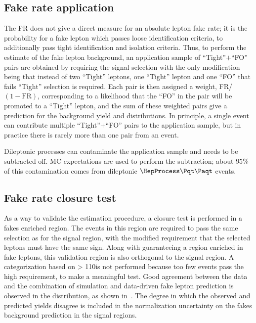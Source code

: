 \subsection{Fake rate application}
\label{subsec:fr_app}
The FR does not give a direct measure for an absolute lepton fake rate; it is the probability for a fake lepton which passes loose identification criteria, to additionally pass tight identification and isolation criteria. Thus, to perform the estimate of the fake lepton background, an application sample of ``Tight''$+$``FO'' pairs are obtained by requiring the signal selection with the only modification being that instead of two ``Tight'' leptons, one ``Tight'' lepton and one ``FO'' that fails ``Tight'' selection is required. Each pair is then assigned a weight, FR/$(1-\mbox{FR})$, corresponding to a likelihood that the ``FO'' in the pair will be promoted to a ``Tight'' lepton, and the sum of these weighted pairs give a prediction for the background yield and distributions. In principle, a single event can contribute multiple ``Tight''$+$``FO'' pairs to the application sample, but in practice there is rarely more than one pair from an event.

Dileptonic processes can contaminate the application sample and needs to be subtracted off. MC expectations are used to perform the subtraction; about $95\%$ of this contamination comes from dileptonic $\ttbar$ events.

\subsection{Fake rate closure test}
\label{subsec:fr_close}
As a way to validate the estimation procedure, a closure test is performed in a fakes enriched region. The events in this region are required to pass the same selection as for the signal region, with the modified requirement that the selected leptons must have the same sign. Along with guaranteeing a region enriched in fake leptons, this validation region is also orthogonal to the signal region. A categorization based on \mttll > 110\:\GeV\:is not performed because too few events pass the high \mttll requirement, to make a meaningful test. Good agreement between the data and the combination of simulation and data-driven fake lepton prediction is observed in the \ptmiss distribution, as shown in~. The degree in which the observed and predicted yields disagree is included in the normalization uncertainty on the fakes background prediction in the signal regions.

